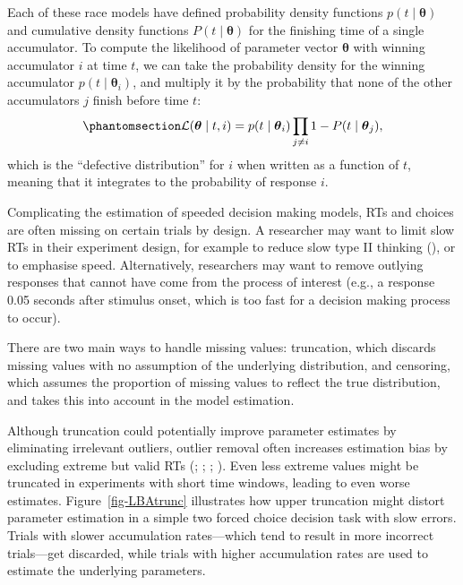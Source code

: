 \documentclass[
  stu,
  floatsintext,
  longtable,
  nolmodern,
  notxfonts,
  notimes,
  draftfirst,
  colorlinks=true,linkcolor=blue,citecolor=blue,urlcolor=blue]{apa7}
\begin{document}
Each of these race models have defined probability density functions
\(p(t \mid \boldsymbol{\theta})\) and cumulative density functions
\(P(t \mid \boldsymbol{\theta})\) for the finishing time of a single
accumulator. To compute the likelihood of parameter vector
\(\boldsymbol{\theta}\) with winning accumulator \(i\) at time \(t\), we
can take the probability density for the winning accumulator
\(p(t \mid \boldsymbol{\theta}_{i})\), and multiply it by the
probability that none of the other accumulators \(j\) finish before time
\(t\): \begin{equation}\phantomsection\label{eq-race-likelihood}{
\mathcal{L}(\boldsymbol{\theta} \mid t, i) = p(t \mid \boldsymbol{\theta}_{i}) \prod_{j \neq i}{1 - P(t \mid \boldsymbol{\theta}_{j})},
}\end{equation} which is the ``defective distribution'' for \(i\) when
written as a function of \(t\), meaning that it integrates to the
probability of response \(i\).

Complicating the estimation of speeded decision making models, RTs and
choices are often missing on certain trials by design. A researcher may
want to limit slow RTs in their experiment design, for example to reduce
slow type II thinking (), or to
emphasise speed. Alternatively, researchers may want to remove outlying
responses that cannot have come from the process of interest (e.g., a
response 0.05 seconds after stimulus onset, which is too fast for a
decision making process to occur).

There are two main ways to handle missing values: truncation, which
discards missing values with no assumption of the underlying
distribution, and censoring, which assumes the proportion of missing
values to reflect the true distribution, and takes this into account in
the model estimation.

Although truncation could potentially improve parameter estimates by
eliminating irrelevant outliers, outlier removal often increases
estimation bias by excluding extreme but valid RTs
(;
;
;
). Even less extreme
values might be truncated in experiments with short time windows,
leading to even worse estimates. Figure~\ref{fig-LBAtrunc} illustrates
how upper truncation might distort parameter estimation in a simple two
forced choice decision task with slow errors. Trials with slower
accumulation rates---which tend to result in more incorrect trials---get
discarded, while trials with higher accumulation rates are used to
estimate the underlying parameters.
\end{document}
